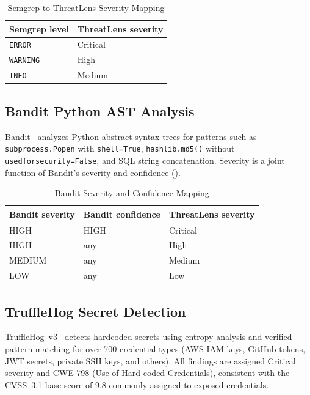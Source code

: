 \documentclass[conference]{IEEEtran}
\newcommand{\tsz}{\footnotesize}
\begin{document}
\begin{table}[!t]
\caption{Semgrep-to-ThreatLens Severity Mapping}
\label{tab:semgrep_sev}
\centering\tsz
\begin{tabular}{@{}ll@{}}
\toprule
\textbf{Semgrep level} & \textbf{ThreatLens severity}\\
\midrule
\texttt{ERROR}   & Critical\\
\texttt{WARNING} & High\\
\texttt{INFO}    & Medium\\
\bottomrule
\end{tabular}
\end{table}

\subsection{Bandit Python AST Analysis}
Bandit~\cite{bandit} analyzes Python abstract syntax trees for patterns such as
\texttt{subprocess.Popen} with \texttt{shell=True}, \texttt{hashlib.md5()}
without \texttt{usedforsecurity=False}, and SQL string concatenation. Severity
is a joint function of Bandit's severity and confidence ().

\begin{table}[!t]
\caption{Bandit Severity and Confidence Mapping}
\label{tab:bandit_sev}
\centering\tsz
\begin{tabular}{@{}lll@{}}
\toprule
\textbf{Bandit severity} & \textbf{Bandit confidence} & \textbf{ThreatLens severity}\\
\midrule
HIGH   & HIGH & Critical\\
HIGH   & any  & High\\
MEDIUM & any  & Medium\\
LOW    & any  & Low\\
\bottomrule
\end{tabular}
\end{table}

\subsection{TruffleHog Secret Detection}
TruffleHog~v3~\cite{trufflehog} detects hardcoded secrets using entropy analysis
and verified pattern matching for over 700 credential types (AWS IAM keys, GitHub
tokens, JWT secrets, private SSH keys, and others). All findings are assigned
Critical severity and CWE-798 (Use of Hard-coded Credentials), consistent with
the CVSS~3.1 base score of 9.8 commonly assigned to exposed credentials.
\end{document}
